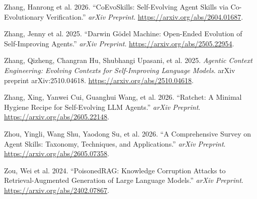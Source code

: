 \documentclass[
]{article}
\newlength{\cslhangindent}
\newenvironment{CSLReferences}[2] %
 {\begin{list}{}{%
  \setlength{\itemindent}{0pt}
  \setlength{\leftmargin}{0pt}
  \setlength{\parsep}{0pt}
  \ifodd #1
   \setlength{\leftmargin}{\cslhangindent}
   \setlength{\itemindent}{-1\cslhangindent}
  \fi
  \setlength{\itemsep}{#2\baselineskip}}}
 {\end{list}}
\begin{document}
\begin{CSLReferences}{1}{1}
{Zhang, Hanrong et al.} 2026. {``{CoEvoSkills}: Self-Evolving Agent
Skills via Co-Evolutionary Verification.''} \emph{arXiv Preprint}.
\url{https://arxiv.org/abs/2604.01687}.

{Zhang, Jenny et al.} 2025. {``Darwin {Gödel} Machine: Open-Ended
Evolution of Self-Improving Agents.''} \emph{arXiv Preprint}.
\url{https://arxiv.org/abs/2505.22954}.

{Zhang, Qizheng, Changran Hu, Shubhangi Upasani, et al.} 2025.
\emph{Agentic Context Engineering: Evolving Contexts for Self-Improving
Language Models}. arXiv preprint arXiv:2510.04618.
\url{https://arxiv.org/abs/2510.04618}.

Zhang, Xing, Yanwei Cui, Guanghui Wang, et al. 2026. {``{Ratchet}: A
Minimal Hygiene Recipe for Self-Evolving {LLM} Agents.''} \emph{arXiv
Preprint}. \url{https://arxiv.org/abs/2605.22148}.

{Zhou, Yingli, Wang Shu, Yaodong Su, et al.} 2026. {``A Comprehensive
Survey on Agent Skills: Taxonomy, Techniques, and Applications.''}
\emph{arXiv Preprint}. \url{https://arxiv.org/abs/2605.07358}.

{Zou, Wei et al.} 2024. {``{PoisonedRAG}: Knowledge Corruption Attacks
to Retrieval-Augmented Generation of Large Language Models.''}
\emph{arXiv Preprint}. \url{https://arxiv.org/abs/2402.07867}.

\end{CSLReferences}
\end{document}
